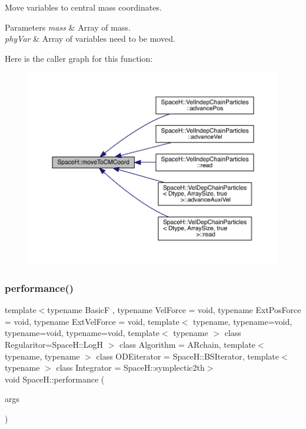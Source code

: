 Move variables to central mass coordinates. 


\begin{DoxyParams}{Parameters}
{\em mass} & Array of mass. \\
\hline
{\em phy\+Var} & Array of variables need to be moved. \\
\hline
\end{DoxyParams}
Here is the caller graph for this function\+:
\nopagebreak
\begin{figure}[H]
\begin{center}
\leavevmode
\includegraphics[width=350pt]{namespace_space_h_afb4e29bf684f5b98b6022db70cab0321_icgraph}
\end{center}
\end{figure}
\mbox{\label{namespace_space_h_a49b8d303aa5a0ac25f38b91ae20bb721}} 
\subsubsection{\texorpdfstring{performance()}{performance()}}
{\footnotesize\ttfamily template$<$typename BasicF , typename Vel\+Force  = void, typename Ext\+Pos\+Force  = void, typename Ext\+Vel\+Force  = void, template$<$ typename, typename=void, typename=void, typename=void, template$<$ typename $>$ class Regularitor=\+Space\+H\+::\+Log\+H $>$ class Algorithm = A\+Rchain, template$<$ typename, typename $>$ class O\+D\+Eiterator = Space\+H\+::\+B\+S\+Iterator, template$<$ typename $>$ class Integrator = Space\+H\+::symplectic2th$>$ \\
void Space\+H\+::performance (\begin{DoxyParamCaption}\item[{\mbox{\hyperlink{struct_space_h_1_1_run_args}{Run\+Args}} \&}]{args }\end{DoxyParamCaption})}

